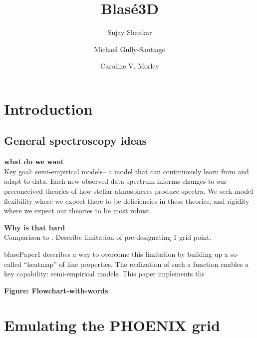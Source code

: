 \documentclass[twocolumn]{aastex631}
\begin{document}
\title{Blas\'e3D}

\author[0000-0002-2290-6810]{Sujay Shankar}
\author[0000-0002-4020-3457]{Michael Gully-Santiago}
\author[0000-0002-4404-0456]{Caroline V. Morley}

\begin{abstract}
    \blindtext
\end{abstract}

\keywords{}


\section{Introduction}



\subsection{General spectroscopy ideas}

\textbf{what do we want}\\
Key goal: semi-empirical models-- a model that can continuously learn from and adapt to data.  Each new observed data spectrum informs changes to our preconceived theories of how stellar atmospheres produce spectra.  We seek model flexibility where we expect there to be deficiencies in these theories, and rigidity where we expect our theories to be most robust.

\textbf{Why is that hard}\\



Comparison to \citet{czekala15}.  Describe limitation of pre-designating 1 grid point.




blasePaper1 describes a way to overcome this limitation by building up a so-called ``heatmap'' of line properties.  The realization of such a function enables a key capability: semi-empirical models.
This paper implements ths



\begin{mdframed}
    \textbf{Figure: Flowchart-with-words}
\end{mdframed}

\section{Emulating the PHOENIX grid}
\end{document}
